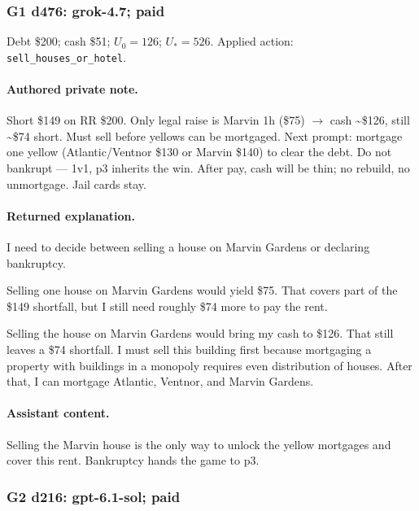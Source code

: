 \subsubsection*{G1 d476: grok-4.7; paid}

Debt \$200; cash \$51; $U_0=126$; $U_*=526$. Applied action: \texttt{sell\_houses\_or\_hotel}.

\paragraph{Authored private note.}

{\small Short \$149 on RR \$200. Only legal raise is Marvin 1h (\$75) $\rightarrow$ cash \textasciitilde{}\$126, still \textasciitilde{}\$74 short. Must sell before yellows can be mortgaged. Next prompt: mortgage one yellow (Atlantic/Ventnor \$130 or Marvin \$140) to clear the debt. Do not bankrupt — 1v1, p3 inherits the win. After pay, cash will be thin; no rebuild, no unmortgage. Jail cards stay.\par}

\paragraph{Returned explanation.}

{\small I need to decide between selling a house on Marvin Gardens or declaring bankruptcy.
\par
Selling one house on Marvin Gardens would yield \$75. That covers part of the \$149 shortfall, but I still need roughly \$74 more to pay the rent.
\par
Selling the house on Marvin Gardens would bring my cash to \$126. That still leaves a \$74 shortfall. I must sell this building first because mortgaging a property with buildings in a monopoly requires even distribution of houses. After that, I can mortgage Atlantic, Ventnor, and Marvin Gardens.\par}

\paragraph{Assistant content.}

{\small Selling the Marvin house is the only way to unlock the yellow mortgages and cover this rent. Bankruptcy hands the game to p3.\par}

\medskip

\subsubsection*{G2 d216: gpt-6.1-sol; paid}

